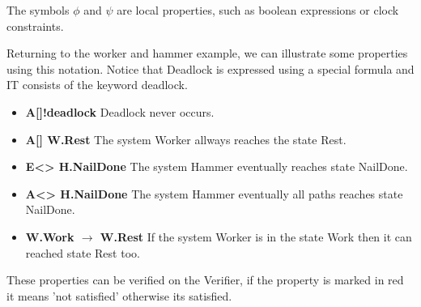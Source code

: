 The symbols $\phi$ and $\psi$ are local properties, such as boolean expressions or clock constraints.

Returning to the worker and hammer example, we can illustrate some properties using this notation. Notice that Deadlock is expressed using a special formula and IT consists of the keyword deadlock. 

\begin{itemize}
    \item \textbf{A[]!deadlock} Deadlock never occurs.

    \item \textbf{A[] W.Rest} The system Worker allways reaches the state Rest.

    \item \textbf{E<> H.NailDone} The system Hammer eventually reaches state NailDone.

    \item  \textbf{A<> H.NailDone} The system Hammer eventually all paths reaches state NailDone.

    \item \textbf{W.Work $\longrightarrow$ W.Rest} If the system Worker is in the state Work then it can reached state Rest too.
\end{itemize}

These properties can be verified on the Verifier, if the property is marked in red it means 'not satisfied' otherwise its satisfied.







